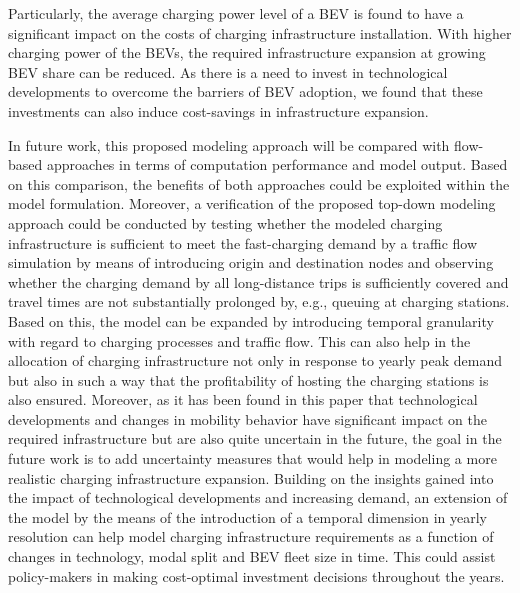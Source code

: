 \documentclass[journal,article,submit,pdftex,moreauthors]{Definitions/mdpi}
\begin{document}

Particularly, the average charging power level of a BEV is found to have a significant impact on the costs of charging infrastructure installation. With  higher charging power of the BEVs, the required infrastructure expansion at growing BEV share can be reduced. As there is a need to invest in technological developments to overcome the barriers of BEV adoption, we found that these investments can also induce cost-savings in infrastructure expansion. 

In future work, this proposed modeling approach will be compared with flow-based approaches in terms of computation performance and model output. Based on this comparison, the benefits of both approaches could be exploited within the model formulation. Moreover, a verification of the proposed top-down modeling approach could be conducted by testing whether the modeled charging infrastructure is sufficient to meet the fast-charging demand by a traffic flow simulation by means of introducing origin and destination nodes and observing whether the charging demand by all long-distance trips is sufficiently covered and travel times are not substantially prolonged by, e.g., queuing at charging stations. Based on this, the model can be expanded by introducing temporal granularity with regard to charging processes and traffic flow. This can also help in the allocation of charging infrastructure not only in response to yearly peak demand but also in such a way that the profitability of hosting the charging stations is also ensured. Moreover, as it has been found in this paper that technological developments and changes in mobility behavior have significant impact on the required infrastructure but are also quite uncertain in the future, the goal in the future work is to add uncertainty measures that would help in modeling a more realistic charging infrastructure expansion. Building on the insights gained into the impact of technological developments and increasing demand, an extension of the model by the means of the introduction of a temporal dimension in yearly resolution can help model charging infrastructure requirements as a function of changes in technology, modal split and BEV fleet size in time. This could assist policy-makers in making cost-optimal investment decisions throughout the years.
\end{document}
